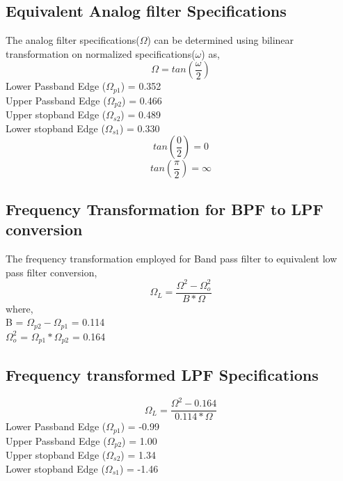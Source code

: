 \documentclass[12pt]{article}
\begin{document}
\subsection{Equivalent Analog filter Specifications}
The analog filter specifications($\Omega$) can be determined using bilinear transformation on normalized specifications($\omega$) as,
\begin{equation}
    \Omega = tan(\frac{\omega}{2})
\end{equation}
Lower Passband Edge ($\Omega_{p1}$) = 0.352\\
Upper Passband Edge ($\Omega_{p2}$) = 0.466\\
Upper stopband Edge ($\Omega_{s2}$) = 0.489\\
Lower stopband Edge ($\Omega_{s1}$) = 0.330\\
\begin{equation}
    tan(\frac{0}{2}) = 0
\end{equation}
\begin{equation}
    tan(\frac{\pi}{2}) = \infty
\end{equation}
\subsection{Frequency Transformation for BPF to LPF conversion}
The frequency transformation employed for Band pass filter to equivalent low pass filter conversion,
\begin{equation}
    \Omega_L = \frac{\Omega^2-\Omega_o^2}{B*\Omega}
\end{equation}
where,\\ 
B = $\Omega_{p2}-\Omega_{p1}$ = 0.114\\
$\Omega_o^2$ = $\Omega_{p1}*\Omega_{p2}$ = 0.164\\

\subsection{Frequency transformed LPF Specifications}
\begin{equation}
    \Omega_L = \frac{\Omega^2-0.164}{0.114*\Omega}
\end{equation}
Lower Passband Edge ($\Omega_{p1}$) = -0.99\\
Upper Passband Edge ($\Omega_{p2}$) = 1.00\\
Upper stopband Edge ($\Omega_{s2}$) = 1.34\\
Lower stopband Edge ($\Omega_{s1}$) = -1.46\\\\
\end{document}
